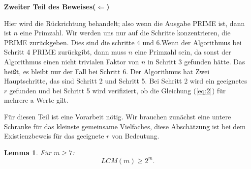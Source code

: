 \documentclass[12pt,oneside]{article}
\newtheorem{lemma}[theorem]{Lemma}
\theoremstyle{remark}
\theoremstyle{definition}
\begin{document}
\textbf{Zweiter Teil des Beweises($\Leftarrow$)}

Hier wird die Rückrichtung behandelt; also  wenn die Ausgabe PRIME ist, dann ist $n$ eine Primzahl. Wir werden uns nur auf die Schritte konzentrieren, die PRIME zurückgeben. Dies sind die schritte 4 und 6.\newline\newline Wenn der Algorithmus bei Schritt 4 PRIME zurückgibt, dann muss $n$ eine Primzahl sein, da sonst der Algorithmus einen nicht trivialen Faktor von $n$ in Schritt 3 gefunden hätte. Das heißt, es bleibt nur der Fall bei Schritt 6. Der Algorithmus hat Zwei Hauptschritte, das sind Schritt 2 und Schritt 5. Bei Schritt 2 wird ein geeignetes $r$ gefunden und bei Schritt 5 wird verifiziert, ob die Gleichung (\ref{eq:2}) für mehrere a Werte gilt.    

Für diesen Teil ist eine Vorarbeit nötig. Wir brauchen zunächst eine untere Schranke für das kleinste gemeinsame Vielfaches, diese Abschätzung ist bei dem Existienzbeweis für das geeignete $r$ von Bedeutung.


\begin{lemma}\label{lemma_1}
Für $m \geq 7$:\newline
\begin{equation}
    LCM(m) \geq 2^m.  
\end{equation}
\end{lemma}
\end{document}
